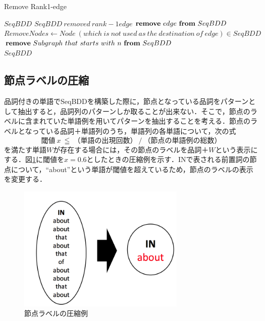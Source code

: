 \documentclass[12pt,twoside, fleqn]{ujbook}
\begin{document}
	\begin{algorithm}
	\caption{Remove Rank1-edge}
	\label{alg:remove_rank1}
	\begin{algorithmic}[1]
	\REQUIRE $SeqBDD$
	\ENSURE  $SeqBDD\ removed\ rank−1edge$
				\STATE ${\bf remove}\ edge\ {\bf from}\ SeqBDD$	
			\ENDIF
		\ENDFOR
		\STATE	$RemoveNodes \leftarrow Node\ (which\ is\ not\ used\ as\ the\ destination\ of\ edge)\in SeqBDD$
			\STATE ${\bf remove}\ Subgraph\ that\ starts\ with\ n\ {\bf from}\ SeqBDD$\\
		\ENDFOR
		\RETURN $SeqBDD$
	\end{algorithmic}
	\end{algorithm}


	\subsection{節点ラベルの圧縮}
	\label{text:assyuku}
	品詞付きの単語でSeqBDDを構築した際に，節点となっている品詞をパターンとして抽出すると，品詞列のパターンしか取ることが出来ない．そこで，節点のラベルに含まれていた単語例を用いてパターンを抽出することを考える．節点のラベルとなっている品詞＋単語列のうち，単語列の各単語について，次の式
	\begin{equation}
	\label{exp:sup_node}
	閾値\ x\ ≦\ （単語の出現回数）\ /\ （節点の単語例の総数）
	\end{equation}
	を満たす単語$W$が存在する場合には，その節点のラベルを品詞＋$W$という表示にする．図\ref{fig:sup_node}に閾値を$x=0.6$としたときの圧縮例を示す．INで表される前置詞の節点について，``about''という単語が閾値を超えているため，節点のラベルの表示を変更する．\\

	\begin{figure}[htbp]
	\begin{center}
		\includegraphics [clip, width=8cm]{./img/sup_node.png}
		\caption{節点ラベルの圧縮例}
		\label{fig:sup_node}
	\end{center}
	\end{figure}	
\end{document}
